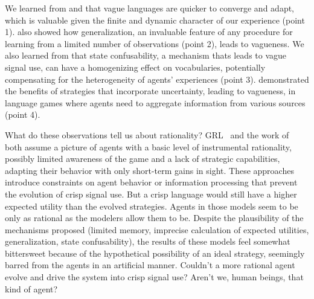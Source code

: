 \documentclass[a4paper]{article}
\begin{document}
We learned from \citeauthor{oconnor_evolution_2014} and \citeauthor{franke_vagueness_2017} that vague languages are quicker to converge and adapt, which is valuable given the finite and dynamic character of our experience (point 1).
\citeauthor{oconnor_evolving_2015} also showed how generalization, an invaluable feature of any procedure for learning from a limited number of observations (point 2), leads to vagueness.
We also learned from \citeauthor{franke_vagueness_2017} that state confusability, a mechanism thats leads to vague signal use, can have a homogenizing effect on vocabularies, potentially compensating for the heterogeneity of agents' experiences (point 3).
\citeauthor{lawry_vagueness_2017} demonstrated the benefits of strategies that incorporate uncertainty, leading to vagueness, in language games where agents need to aggregate information from various sources (point 4).

What do these observations tell us about rationality?
GRL~\parencite{oconnor_evolution_2014} and the work of~\textcite{franke_vagueness_2017} both assume a picture of agents with a basic level of instrumental rationality, possibly limited awareness of the game and a lack of strategic capabilities, adapting their behavior with only short-term gains in sight.
These approaches introduce constraints on agent behavior or information processing that prevent the evolution of crisp signal use.
But a crisp language would still have a higher expected utility than the evolved strategies.
Agents in those models seem to be only as rational as the modelers allow them to be.
Despite the plausibility of the mechanisms proposed (limited memory, imprecise calculation of expected utilities, generalization, state confusability), the results of these models feel somewhat bittersweet because of the hypothetical possibility of an ideal strategy, seemingly barred from the agents in an artificial manner.
Couldn't a more rational agent evolve and drive the system into crisp signal use?
Aren't we, human beings, that kind of agent?
\end{document}
